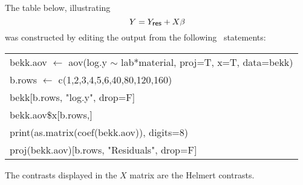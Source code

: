 \begin{table}[tbp]
\label{t.b.reg}

The table below, illustrating
$$ Y = Y_{\mbox{{\protect\small\sf res}}} + X \beta $$
was constructed by editing the output from the following
\iS\ statements:
\begin{center}
\small\sf
\begin{tabular}{l}
bekk.aov $\leftarrow$ aov(log.y $\sim$ lab*material, proj=T, x=T, data=bekk) \\
b.rows $\leftarrow$ c(1,2,3,4,5,6,40,80,120,160)    \\
bekk[b.rows, "log.y", drop=F]               \\
bekk.aov\$x[b.rows,]			  \\
print(as.matrix(coef(bekk.aov)), digits=8) \\
proj(bekk.aov)[b.rows, "Residuals", drop=F]
\end{tabular}
\end{center}
The contrasts displayed in the $X$ matrix are the Helmert contrasts.


\end{table}
